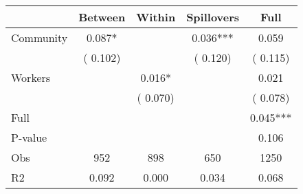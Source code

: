 
\begin{tabular}{l*{4}{c}}\hline&\multicolumn{1}{c}{Between}&\multicolumn{1}{c}{Within}&\multicolumn{1}{c}{Spillovers}&\multicolumn{1}{c}{Full}\\ \hline
 Community             &              0.087*      &                                               &        0.036*** &         0.059                            \\ 
                               &        (       0.102)           &                                       &       (       0.120)     &      (       0.115)                                           \\ 
 Workers       &                                               &        0.016*    &                                &             0.021                            \\ 
                               &                                               & (       0.070)                  &                                        &      (       0.078)                                           \\ 
\hline                                                                                                                                                                                                                                            
 Full                  &                                               &                                               &                                        &             0.045***                                     \\ 
 P-value               &                                               &                                               &                                        &             0.106                                           \\ 
 Obs                   &               952               &       898                       &       650                &              1250                                               \\ 
 R2                    &                      0.092              &              0.000                      &              0.034               &                     0.068                                              \\ 
\hline \end{tabular}                                                                                                                                                                                                              